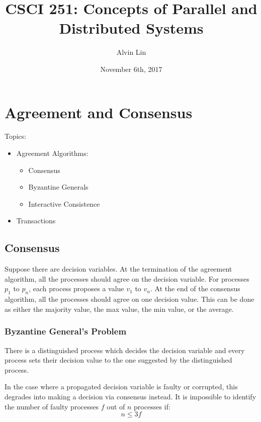 \documentclass{math}
\title{CSCI 251: Concepts of Parallel and Distributed Systems}
\author{Alvin Lin}
\date{November 6th, 2017}
\begin{document}
\maketitle

\section*{Agreement and Consensus}
Topics:
\begin{itemize}
  \item Agreement Algorithms:
    \begin{itemize}
      \item Consensus
      \item Byzantine Generals
      \item Interactive Consistence
    \end{itemize}
  \item Transactions
\end{itemize}

\subsection*{Consensus}
Suppose there are decision variables. At the termination of the agreement
algorithm, all the processes should agree on the decision variable. For
processes \( p_1 \) to \( p_n \), each process proposes a value \( v_1 \) to
\( v_n \). At the end of the consensus algorithm, all the processes should
agree on one decision value. This can be done as either the majority value,
the max value, the min value, or the average.

\subsubsection*{Byzantine General's Problem}
There is a distinguished process which decides the decision variable and every
process sets their decision value to the one suggested by the distinguished
process.
\begin{center}
\end{center}
In the case where a propagated decision variable is faulty or corrupted, this
degrades into making a decision via consensus instead. It is impossible to
identify the number of faulty processes \( f \) out of \( n \) processes if:
\[ n\le3f \]
\end{document}
